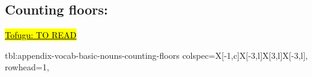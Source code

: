 \documentclass[../nihongo-gakushuu-kyouzai-supplementary.tex]{subfiles}
\begin{document}
\subsection{Counting floors: }
\href{https://www.tofugu.com/japanese/japanese-counter-kai-floors/}{\hl{Tofugu: TO READ}}

{tbl:appendix-vocab-basic-nouns-counting-floors}  %
{
    colspec={X[-1,c]X[-3,l]X[3,l]X[-3,l]},
    rowhead=1,
}  %
\end{document}
